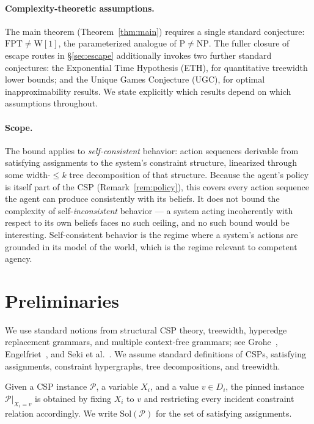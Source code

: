 \documentclass[runningheads]{llncs}
\begin{document}
\paragraph{Complexity-theoretic assumptions.}
The main theorem (Theorem~\ref{thm:main}) requires a single standard conjecture: $\mathrm{FPT} \neq \mathrm{W}[1]$, the parameterized analogue of $\mathrm{P} \neq \mathrm{NP}$.
The fuller closure of escape routes in \S\ref{sec:escape} additionally invokes two further standard conjectures: the Exponential Time Hypothesis (ETH), for quantitative treewidth lower bounds; and the Unique Games Conjecture (UGC), for optimal inapproximability results.
We state explicitly which results depend on which assumptions throughout.

\paragraph{Scope.}
The bound applies to \emph{self-consistent} behavior: action sequences derivable from satisfying assignments to the system's constraint structure, linearized through some width-$\leq k$ tree decomposition of that structure.
Because the agent's policy is itself part of the CSP (Remark~\ref{rem:policy}), this covers every action sequence the agent can produce consistently with its beliefs.
It does not bound the complexity of self-\emph{inconsistent} behavior --- a system acting incoherently with respect to its own beliefs faces no such ceiling, and no such bound would be interesting.
Self-consistent behavior is the regime where a system's actions are grounded in its model of the world, which is the regime relevant to competent agency.

\section{Preliminaries}\label{sec:prelim}

We use standard notions from structural CSP theory, treewidth, hyperedge replacement grammars, and multiple context-free grammars; see Grohe~\cite{Grohe07}, Engelfriet~\cite{Engelfriet97}, and Seki et al.~\cite{Seki91}. We assume standard definitions of CSPs, satisfying assignments, constraint hypergraphs, tree decompositions, and treewidth.

\begin{definition}\label{def:pinned}
Given a CSP instance $\mathcal{P}$, a variable $X_i$, and a value $v \in D_i$, the pinned instance $\mathcal{P}|_{X_i = v}$ is obtained by fixing $X_i$ to $v$ and restricting every incident constraint relation accordingly. We write $\mathrm{Sol}(\mathcal{P})$ for the set of satisfying assignments.
\end{definition}
\end{document}
